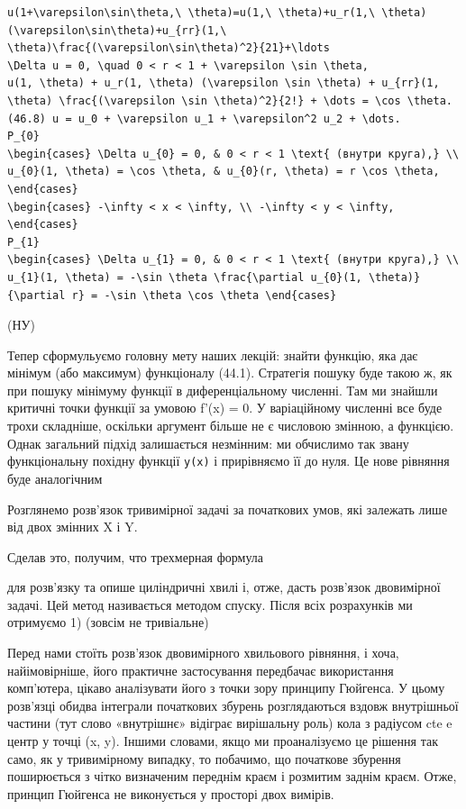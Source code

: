 \documentclass[
  ukrainian,
]{article}
\begin{document}
\begin{verbatim}
u(1+\varepsilon\sin\theta,\ \theta)=u(1,\ \theta)+u_r(1,\ \theta)(\varepsilon\sin\theta)+u_{rr}(1,\ \theta)\frac{(\varepsilon\sin\theta)^2}{21}+\ldots
\Delta u = 0, \quad 0 < r < 1 + \varepsilon \sin \theta,
u(1, \theta) + u_r(1, \theta) (\varepsilon \sin \theta) + u_{rr}(1, \theta) \frac{(\varepsilon \sin \theta)^2}{2!} + \dots = \cos \theta.
(46.8) u = u_0 + \varepsilon u_1 + \varepsilon^2 u_2 + \dots.
P_{0}
\begin{cases} \Delta u_{0} = 0, & 0 < r < 1 \text{ (внутри круга),} \\ u_{0}(1, \theta) = \cos \theta, & u_{0}(r, \theta) = r \cos \theta, \end{cases}
\begin{cases} -\infty < x < \infty, \\ -\infty < y < \infty, \end{cases}
P_{1}
\begin{cases} \Delta u_{1} = 0, & 0 < r < 1 \text{ (внутри круга),} \\ u_{1}(1, \theta) = -\sin \theta \frac{\partial u_{0}(1, \theta)}{\partial r} = -\sin \theta \cos \theta \end{cases}
\end{verbatim}

(НУ)

Тепер сформульуємо головну мету наших лекцій: знайти функцію, яка дає
мінімум (або максимум) функціоналу (44.1). Стратегія пошуку буде такою
ж, як при пошуку мінімуму функції в диференціальному численні. Там ми
знайшли критичні точки функції за умовою f'(x) = 0. У варіаційному
численні все буде трохи складніше, оскільки аргумент більше не є
числовою змінною, а функцією. Однак загальний підхід залишається
незмінним: ми обчислимо так звану функціональну похідну функції
\texttt{y(x)} і прирівняємо її до нуля. Це нове рівняння буде
аналогічним

Розглянемо розв'язок тривимірної задачі за початкових умов, які залежать
лише від двох змінних X і Y.

Сделав это, получим, что трехмерная формула

для розв'язку та опише циліндричні хвилі і, отже, дасть розв'язок
двовимірної задачі. Цей метод називається методом спуску. Після всіх
розрахунків ми отримуємо 1) (зовсім не тривіальне)

Перед нами стоїть розв'язок двовимірного хвильового рівняння, і хоча,
найімовірніше, його практичне застосування передбачає використання
комп'ютера, цікаво аналізувати його з точки зору принципу Гюйгенса. У
цьому розв'язці обидва інтеграли початкових збурень розглядаються вздовж
внутрішньої частини (тут слово «внутрішнє» відіграє вирішальну роль)
кола з радіусом cte e центр у точці (x, y). Іншими словами, якщо ми
проаналізуємо це рішення так само, як у тривимірному випадку, то
побачимо, що початкове збурення поширюється з чітко визначеним переднім
краєм і розмитим заднім краєм. Отже, принцип Гюйгенса не виконується у
просторі двох вимірів.
\end{document}
